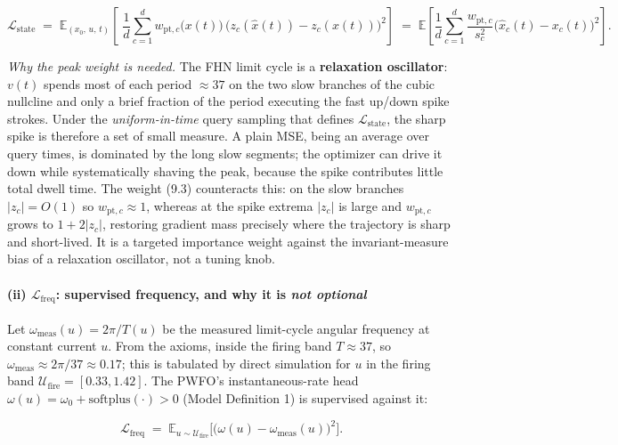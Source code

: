 \documentclass[
  11pt,
]{article}
\providecommand{\gt}{>}
\begin{document}
\[
\mathcal{L}_{\text{state}}
\;=\;
\mathbb{E}_{(x_0,\,u,\,t)}\!\left[\;\frac{1}{d}\sum_{c=1}^{d}
w_{\text{pt},c}\!\big(x(t)\big)\,
\Big(z_c(\hat{x}(t))-z_c(x(t))\Big)^{2}\right]
\;=\;
\mathbb{E}\!\left[\frac{1}{d}\sum_{c=1}^{d}
\frac{w_{\text{pt},c}}{s_c^{2}}\big(\hat{x}_c(t)-x_c(t)\big)^{2}\right].
\tag{9.4}
\]

\emph{Why the peak weight is needed.} The FHN limit cycle is a
\textbf{relaxation oscillator}: \(v(t)\) spends most of each period
\(\approx 37\) on the two slow branches of the cubic nullcline and only
a brief fraction of the period executing the fast up/down spike strokes.
Under the \emph{uniform-in-time} query sampling that defines
\(\mathcal{L}_{\text{state}}\), the sharp spike is therefore a set of
small measure. A plain MSE, being an average over query times, is
dominated by the long slow segments; the optimizer can drive it down
while systematically shaving the peak, because the spike contributes
little total dwell time. The weight (9.3) counteracts this: on the slow
branches \(|z_c|=O(1)\) so \(w_{\text{pt},c}\approx 1\), whereas at the
spike extrema \(|z_c|\) is large and \(w_{\text{pt},c}\) grows to
\(1+2|z_c|\), restoring gradient mass precisely where the trajectory is
sharp and short-lived. It is a targeted importance weight against the
invariant-measure bias of a relaxation oscillator, not a tuning knob.

\paragraph{\texorpdfstring{(ii) \(\mathcal{L}_{\text{freq}}\):
supervised frequency, and why it is \emph{not
optional}}{(ii) \textbackslash mathcal\{L\}\_\{\textbackslash text\{freq\}\}: supervised frequency, and why it is not optional}}\label{ii-mathcall_textfreq-supervised-frequency-and-why-it-is-not-optional}

Let \(\omega_{\text{meas}}(u)=2\pi/T(u)\) be the measured limit-cycle
angular frequency at constant current \(u\). From the axioms, inside the
firing band \(T\approx 37\), so
\(\omega_{\text{meas}}\approx 2\pi/37\approx 0.17\); this is tabulated
by direct simulation for \(u\) in the firing band
\(\mathcal{U}_{\text{fire}}=[0.33,1.42]\). The PWFO's instantaneous-rate
head \(\omega(u)=\omega_0+\text{softplus}(\cdot)\gt 0\) (Model
Definition 1) is supervised against it:

\[
\mathcal{L}_{\text{freq}}
\;=\;
\mathbb{E}_{u\sim\mathcal{U}_{\text{fire}}}\Big[\big(\omega(u)-\omega_{\text{meas}}(u)\big)^{2}\Big].
\tag{9.5}
\]
\end{document}
